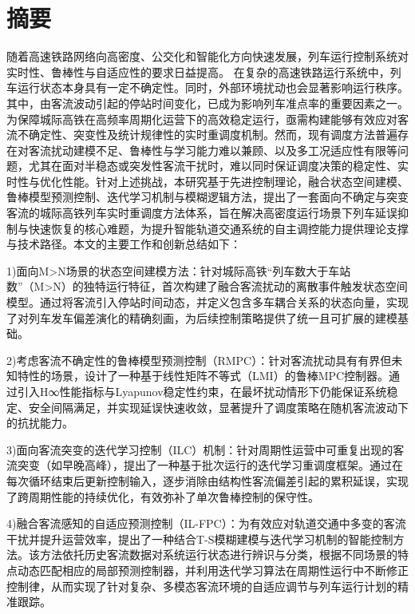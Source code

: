 \chapter{摘\quad 要}%
\linespread{1.5}
随着高速铁路网络向高密度、公交化和智能化方向快速发展，列车运行控制系统对实时性、鲁棒性与自适应性的要求日益提高。
在复杂的高速铁路运行系统中，列车运行状态本身具有一定不确定性。同时，外部环境扰动也会显著影响运行秩序。其中，由客流波动引起的停站时间变化，已成为影响列车准点率的重要因素之一。 为保障城际高铁在高频率周期化运营下的高效稳定运行，亟需构建能够有效应对客流不确定性、突变性及统计规律性的实时重调度机制。然而，现有调度方法普遍存在对客流扰动建模不足、鲁棒性与学习能力难以兼顾、以及多工况适应性有限等问题，尤其在面对半稳态或突发性客流干扰时，难以同时保证调度决策的稳定性、实时性与优化性能。针对上述挑战，本研究基于先进控制理论，融合状态空间建模、鲁棒模型预测控制、迭代学习机制与模糊逻辑方法，提出了一套面向不确定与突变客流的城际高铁列车实时重调度方法体系，旨在解决高密度运行场景下列车延误抑制与快速恢复的核心难题，为提升智能轨道交通系统的自主调控能力提供理论支撑与技术路径。本文的主要工作和创新总结如下：

1)面向M>N场景的状态空间建模方法：针对城际高铁“列车数大于车站数”（M>N）的独特运行特征，首次构建了融合客流扰动的离散事件触发状态空间模型。通过将客流引入停站时间动态，并定义包含多车耦合关系的状态向量，实现了对列车发车偏差演化的精确刻画，为后续控制策略提供了统一且可扩展的建模基础。

2)考虑客流不确定性的鲁棒模型预测控制（RMPC）：针对客流扰动具有有界但未知特性的场景，设计了一种基于线性矩阵不等式（LMI）的鲁棒MPC控制器。通过引入H∞性能指标与Lyapunov稳定性约束，在最坏扰动情形下仍能保证系统稳定、安全间隔满足，并实现延误快速收敛，显著提升了调度策略在随机客流波动下的抗扰能力。

3)面向客流突变的迭代学习控制（ILC）机制：针对周期性运营中可重复出现的客流突变（如早晚高峰），提出了一种基于批次运行的迭代学习重调度框架。通过在每次循环结束后更新控制输入，逐步消除由结构性客流偏差引起的累积延误，实现了跨周期性能的持续优化，有效弥补了单次鲁棒控制的保守性。

4)融合客流感知的自适应预测控制（IL-FPC）：为有效应对轨道交通中多变的客流干扰并提升运营效率，提出了一种结合T-S模糊建模与迭代学习机制的智能控制方法。该方法依托历史客流数据对系统运行状态进行辨识与分类，根据不同场景的特点动态匹配相应的局部预测控制器，并利用迭代学习算法在周期性运行中不断修正控制律，从而实现了针对复杂、多模态客流环境的自适应调节与列车运行计划的精准跟踪。

